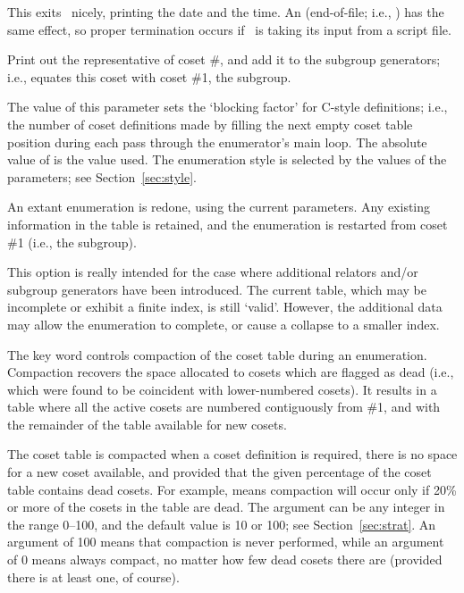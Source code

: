 This exits \ace\ nicely, printing the date and the time.
An  (end-of-file; i.e., ) has the same effect, so 
  proper termination occurs if \ace\ is taking its input from a script
  file.

\quad{}

Print out the representative of coset \#, and add it to the
  subgroup generators; i.e., equates this coset with coset \#1, the
  subgroup.

\quad{}

The value of this parameter sets the `blocking factor' for C-style
  definitions; i.e., the number of coset definitions made by filling the
  next empty coset table position during each pass through the enumerator's
  main loop.
The absolute value of  is the value used.
The enumeration style is selected by the values of the  \amp
   parameters; see Section~\ref{sec:style}.

\quad{}

An extant enumeration is redone, using the current parameters.
Any existing information in the table is retained, and the enumeration
  is restarted from coset \#1 (i.e., the subgroup).

This option is really intended for the case where additional relators
  and/or subgroup generators have been introduced.
The current table, which may be incomplete or exhibit a finite index, is
  still `valid'\kern-1.5pt.
However, the additional data may allow the enumeration to complete, or
  cause a collapse to a smaller index.

\quad{}

The key word  controls compaction of the coset table during an
  enumeration.
Compaction recovers the space allocated to cosets which are flagged as 
  dead (i.e., which were found to be coincident with lower-numbered
  cosets). 
It results in a table where all the active cosets are numbered contiguously
  from \#1, and with the remainder of the table available for new cosets.

The coset table is compacted when a coset definition is required, there is
  no space for a new coset available, and provided that the given 
  percentage of the coset table contains dead cosets.
For example,  means compaction will occur only if 20\% or more
  of the cosets in the table are dead.
The argument can be any integer in the range 0--100, and the default value
  is 10 or 100; see Section~\ref{sec:strat}.
An argument of 100 means that compaction is never performed, while an
  argument of 0 means always compact, no matter how few dead cosets there
  are (provided there is at least one, of course).

